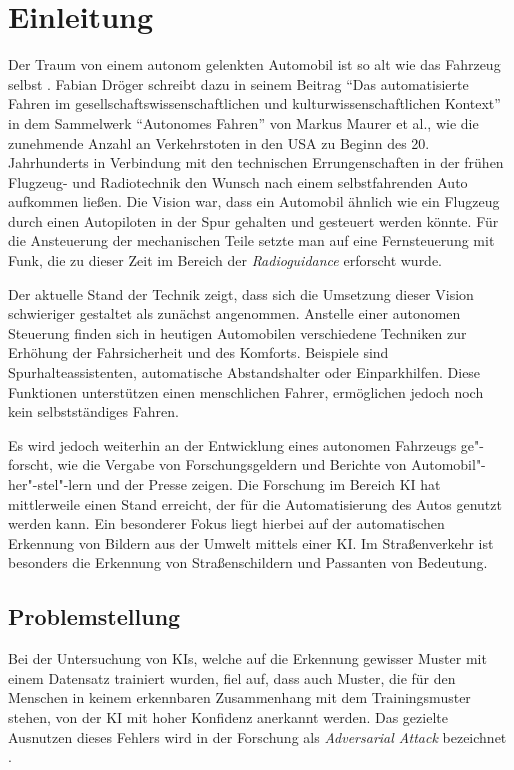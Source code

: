 \chapter{Einleitung}
\label{cha:Einleitung}
\setlength{\epigraphwidth}{4in}

Der Traum von einem autonom gelenkten Automobil ist so alt wie das Fahrzeug selbst \cite{maurer_autonomes_2015}. Fabian Dröger schreibt dazu in seinem Beitrag "`Das automatisierte Fahren im gesellschaftswissenschaftlichen und kulturwissenschaftlichen Kontext"' in dem Sammelwerk "`Autonomes Fahren"' von Markus Maurer et al., wie die zunehmende Anzahl an Verkehrstoten in den USA zu Beginn des 20. Jahrhunderts in Verbindung mit den technischen Errungenschaften in der frühen Flugzeug- und Radiotechnik den Wunsch nach einem selbstfahrenden Auto aufkommen ließen. Die Vision war, dass ein Automobil ähnlich wie ein Flugzeug durch einen Autopiloten in der Spur gehalten und gesteuert werden könnte. Für die Ansteuerung der mechanischen Teile setzte man auf eine Fernsteuerung mit Funk, die zu dieser Zeit im Bereich der \emph{Radioguidance} erforscht wurde.

Der aktuelle Stand der Technik zeigt, dass sich die Umsetzung dieser Vision schwieriger gestaltet als zunächst angenommen. Anstelle einer autonomen Steuerung finden sich in heutigen Automobilen verschiedene Techniken zur Erhöhung der Fahrsicherheit und des Komforts. Beispiele sind Spurhalteassistenten, automatische Abstandshalter oder Einparkhilfen. Diese Funktionen unterstützen einen menschlichen Fahrer, ermöglichen jedoch noch kein selbstständiges Fahren.

Es wird jedoch weiterhin an der Entwicklung eines autonomen Fahrzeugs ge"-forscht, wie die Vergabe von Forschungsgeldern \cite{bmbf-internetredaktion_auto_nodate} und Berichte von Automobil"-her"-stel"-lern \cite{bmw_autonomes_nodate} und der Presse \cite{efler_autonomes_2018} zeigen. Die Forschung im Bereich \ac{KI} hat mittlerweile einen Stand erreicht, der für die Automatisierung des Autos genutzt werden kann. Ein besonderer Fokus liegt hierbei auf der automatischen Erkennung von Bildern aus der Umwelt mittels einer \ac{KI}. Im Straßenverkehr ist besonders die Erkennung von Straßenschildern und Passanten von Bedeutung.


\section{Problemstellung}
\label{sec:Problemstellung}
Bei der Untersuchung von \acp{KI}, welche auf die Erkennung gewisser Muster mit einem Datensatz trainiert wurden, fiel auf, dass auch Muster, die für den Menschen in keinem erkennbaren Zusammenhang mit dem Trainingsmuster stehen, von der \ac{KI} mit hoher Konfidenz anerkannt werden. Das gezielte Ausnutzen dieses Fehlers wird in der Forschung als \textit{Adversarial Attack} bezeichnet \cite{DBLP:journals/corr/HuangPGDA17}.

